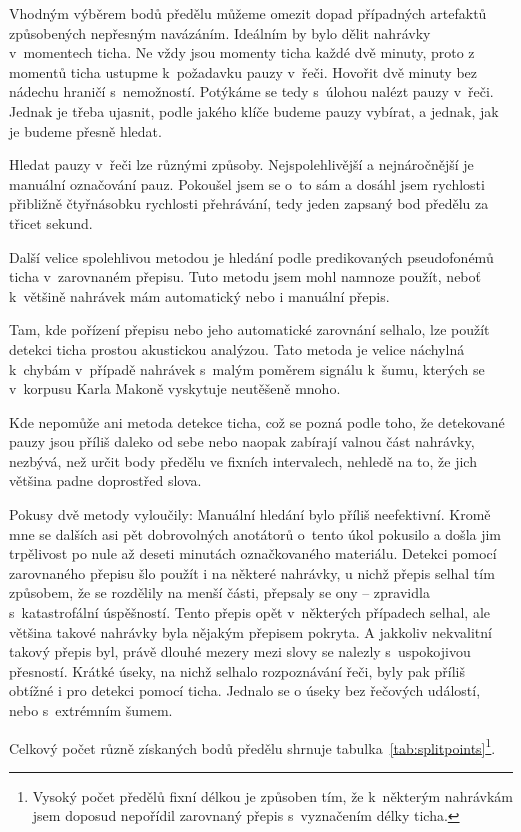 Vhodným výběrem bodů předělu můžeme omezit dopad případných artefaktů
způsobených nepřesným navázáním. Ideálním by bylo dělit nahrávky v~momentech
ticha. Ne vždy jsou momenty ticha každé dvě minuty, proto z momentů ticha
ustupme k~požadavku pauzy v~řeči. Hovořit dvě minuty bez nádechu hraničí
s~nemožností. Potýkáme se tedy s~úlohou nalézt pauzy v~řeči. Jednak je třeba
ujasnit, podle jakého klíče budeme pauzy vybírat, a jednak, jak je budeme přesně
hledat.

Hledat pauzy v~řeči lze různými způsoby. Nejspolehlivější a nejnáročnější je
manuální označování pauz. Pokoušel jsem se o~to sám a dosáhl jsem rychlosti
přibližně čtyřnásobku rychlosti přehrávání, tedy jeden zapsaný bod předělu za
třicet sekund.

Další velice spolehlivou metodou je hledání podle predikovaných pseudofonémů
ticha v~zarovnaném přepisu. Tuto metodu jsem mohl namnoze použít, neboť
k~většině nahrávek mám automatický nebo i manuální přepis.

Tam, kde pořízení přepisu nebo jeho automatické zarovnání selhalo, lze použít
detekci ticha prostou akustickou analýzou. Tato metoda je velice náchylná
k~chybám v~případě nahrávek s~malým poměrem signálu k~šumu, kterých se v~korpusu
Karla Makoně vyskytuje neutěšeně mnoho.

Kde nepomůže ani metoda detekce ticha, což se pozná podle toho, že detekované
pauzy jsou příliš daleko od sebe nebo naopak zabírají valnou část nahrávky,
nezbývá, než určit body předělu ve fixních intervalech, nehledě na to, že jich
většina padne doprostřed slova.

Pokusy dvě metody vyloučily: Manuální hledání bylo příliš neefektivní. Kromě mne
se dalších asi pět dobrovolných anotátorů o~tento úkol pokusilo a došla jim
trpělivost po nule až deseti minutách označkovaného materiálu. Detekci pomocí
zarovnaného přepisu šlo použít i na některé nahrávky, u nichž přepis selhal tím
způsobem, že se rozdělily na menší části, přepsaly se ony -- zpravidla
s~katastrofální úspěšností. Tento přepis opět v~některých případech selhal, ale
většina takové nahrávky byla nějakým přepisem pokryta. A jakkoliv nekvalitní
takový přepis byl, právě dlouhé mezery mezi slovy se nalezly s~uspokojivou
přesností. Krátké úseky, na nichž selhalo rozpoznávání řeči, byly pak příliš
obtížné i pro detekci pomocí ticha. Jednalo se o úseky bez řečových událostí,
nebo s~extrémním šumem.


Celkový počet různě získaných bodů předělu shrnuje
tabulka~\ref{tab:splitpoints}\footnote{Vysoký počet předělů fixní délkou je způsoben tím, že
k~některým nahrávkám jsem doposud nepořídil zarovnaný přepis s~vyznačením délky
ticha.}.

